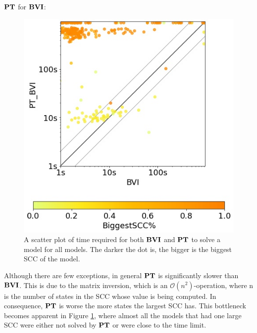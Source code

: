 $\TOPAlg$ for $\BVI$:
\begin{figure}[h!]
    \centering
    \includegraphics[width=1\textwidth]{figures/colorScatter_BVI_TOP.jpg}
    \caption[$\BVI$ compared to $\TOPAlg$]{
        A scatter plot of time required for both $\BVI$ and $\TOPAlg$ to solve a model for all models.
        The darker the dot is, the bigger is the biggest SCC of the model.
    }
    \label{fig:colorScatterBviTop}
\end{figure}
\FloatBarrier

Although there are few exceptions, in general $\TOPAlg$ is significantly slower than $\BVI$.
This is due to the matrix inversion, which is an $\mathcal{O}(n^{2})$-operation, where n is the number of states in the SCC whose value is being computed.
In consequence, $\TOPAlg$ is worse the more states the largest SCC has. This bottleneck becomes apparent in Figure \ref{fig:colorScatterBviTop}, 
where almost all the models that had one large SCC were either not solved by $\TOPAlg$ or were close to the time limit. 


